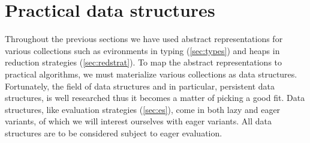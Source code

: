 \chapter{Practical data structures}
Throughout the previous sections we have used abstract representations for various collections such as evironments in typing (\autoref{sec:types}) and heaps in reduction strategies (\autoref{sec:redstrat}).
To map the abstract representations to practical algorithms, we must materialize various collections as data structures.
Fortunately, the field of data structures and in particular, persistent data structures, is well researched thus it becomes a matter of picking a good fit.
Data structures, like evaluation strategies (\autoref{sec:es}), come in both lazy and eager variants, of which we will interest ourselves with eager variants.
All data structures are to be considered subject to eager evaluation.

\clearpage







%
